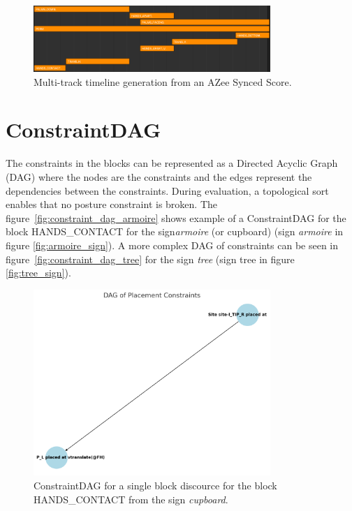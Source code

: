 \documentclass[../../main.tex]{subfiles}
\begin{document}
\begin{figure}[h]
    \centering
    \includegraphics[width=0.8\textwidth]{chapters/multi_track/images/azee_timeline.png}
    \caption{Multi-track timeline generation from an AZee Synced Score.}
    \label{fig:azee_timeline}
\end{figure}


\section{ConstraintDAG}
\label{ch:multi_track:constraint_dag}



The constraints in the blocks can be represented as a Directed Acyclic Graph (DAG) where the nodes are the constraints and the edges represent the dependencies between the constraints. During evaluation, a topological sort enables that no posture constraint is broken. The figure~\ref{fig:constraint_dag_armoire} shows example of a ConstraintDAG for the block HANDS_CONTACT for the sign\emph{armoire} (or cupboard) (sign \emph{armoire} in figure \ref{fig:armoire_sign}). A more complex DAG of constraints can be seen in figure~\ref{fig:constraint_dag_tree} for the sign \emph{tree} (sign tree in figure \ref{fig:tree_sign}).

\begin{figure}[h]
    \centering
    \includegraphics[width=0.8\textwidth]{chapters/multi_track/images/constraint_dag_cupboard.png}
    \caption{ConstraintDAG for a single block discource for the block HANDS\_CONTACT from the sign \emph{cupboard}.}
    \label{fig:constraint_dag_cupboard}
\end{figure}
\end{document}
